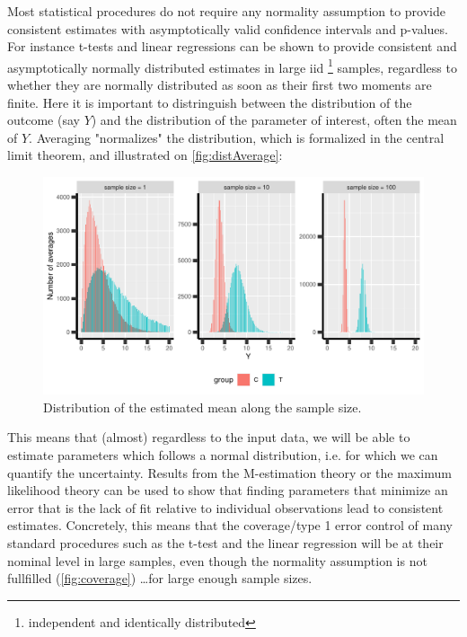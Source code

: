 \documentclass[12pt]{article}
\begin{document}
Most statistical procedures do not require any normality assumption to
provide consistent estimates with asymptotically valid confidence
intervals and p-values. For instance t-tests and linear regressions
can be shown to provide consistent and asymptotically normally
distributed estimates in large iid \footnote{independent and identically
distributed} samples, regardless to whether they are normally
distributed as soon as their first two moments are finite. Here it is
important to distringuish between the distribution of the outcome (say
\(Y\)) and the distribution of the parameter of interest, often the
mean of \(Y\). Averaging "normalizes" the distribution, which is
formalized in the central limit theorem, and illustrated on
\autoref{fig:distAverage}:

\begin{figure}[!h]
\centering
\includegraphics[width=\textwidth]{./figures/examples-histAverage.pdf}
\caption{\label{fig:distAverage}Distribution of the estimated mean along the sample size.}
\end{figure}

This means that (almost) regardless to the input data, we will be able
to estimate parameters which follows a normal distribution, i.e. for
which we can quantify the uncertainty. Results from the M-estimation
theory or the maximum likelihood theory can be used to show that
finding parameters that minimize an error that is the lack of fit
relative to individual observations lead to consistent
estimates. Concretely, this means that the coverage/type 1 error
control of many standard procedures such as the t-test and the linear
regression will be at their nominal level in large samples, even
though the normality assumption is not fullfilled
(\autoref{fig:coverage}) \ldots for large enough sample sizes.
\end{document}
